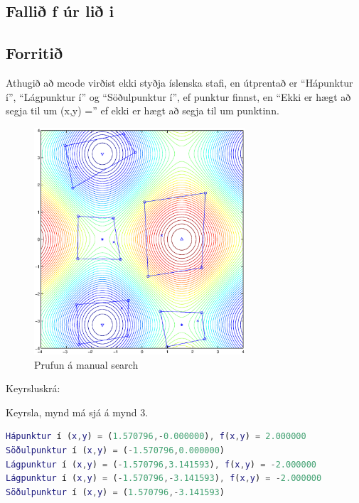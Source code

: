 \documentclass[a4]{article}
\begin{document}
\subsection*{Fallið f úr lið i}

\subsection*{Forritið}

Athugið að mcode virðist ekki styðja íslenska stafi, en útprentað er
``Hápunktur í'', ``Lágpunktur í'' og ``Söðulpunktur í'', ef punktur finnst,
en ``Ekki er hægt að segja til um (x,y) ='' ef ekki er hægt að segja til um punktinn.\\



\begin{figure}[h!]
\centering
\includegraphics[width=0.7\textwidth]{manualdaemi1.eps}
\caption{Prufun á manual search}
\end{figure}

\newpage
Keyrsluskrá:

Keyrsla, mynd má sjá á mynd 3.
\begin{lstlisting}[language=Matlab]
Hápunktur í (x,y) = (1.570796,-0.000000), f(x,y) = 2.000000
Söðulpunktur í (x,y) = (-1.570796,0.000000)
Lágpunktur í (x,y) = (-1.570796,3.141593), f(x,y) = -2.000000
Lágpunktur í (x,y) = (-1.570796,-3.141593), f(x,y) = -2.000000
Söðulpunktur í (x,y) = (1.570796,-3.141593)
\end{lstlisting}
\end{document}
